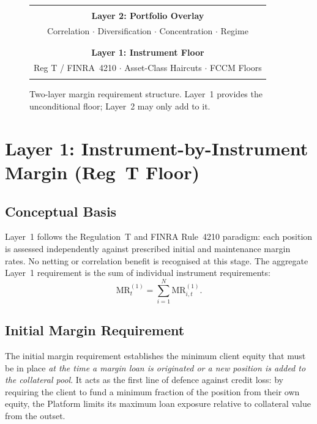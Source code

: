 \documentclass[12pt, a4paper]{article}
\newcommand{\MR}{\mathrm{MR}}
\begin{document}
\begin{figure}[H]
\centering
\begin{tabular}{|c|}
\hline
\\
\textbf{Layer 2: Portfolio Overlay} \\
{\small Correlation $\cdot$ Diversification $\cdot$ Concentration $\cdot$ Regime} \\
\\
\hline
\\
\textbf{Layer 1: Instrument Floor} \\
{\small Reg T / FINRA~4210 $\cdot$ Asset-Class Haircuts $\cdot$ FCCM Floors} \\
\\
\hline
\end{tabular}
\caption{Two-layer margin requirement structure. Layer~1 provides the
unconditional floor; Layer~2 may only add to it.}
\label{fig:layers}
\end{figure}

\section{Layer 1: Instrument-by-Instrument Margin (Reg~T Floor)}
\label{sec:layer1}

\subsection{Conceptual Basis}
Layer~1 follows the Regulation~T and FINRA Rule~4210 paradigm: each
position is assessed independently against prescribed initial and maintenance
margin rates. No netting or correlation benefit is recognised at this stage.
The aggregate Layer~1 requirement is the sum of individual instrument
requirements:
\begin{equation}
    \MR_t^{(1)} = \sum_{i=1}^{N} \MR_{i,t}^{(1)}.
    \label{eq:layer1_aggregate}
\end{equation}

\subsection{Initial Margin Requirement}
\label{subsec:initial_margin}

The initial margin requirement establishes the minimum client equity that
must be in place \emph{at the time a margin loan is originated or a new
position is added to the collateral pool}. It acts as the first line of
defence against credit loss: by requiring the client to fund a minimum
fraction of the position from their own equity, the Platform limits its
maximum loan exposure relative to collateral value from the outset.
\end{document}
